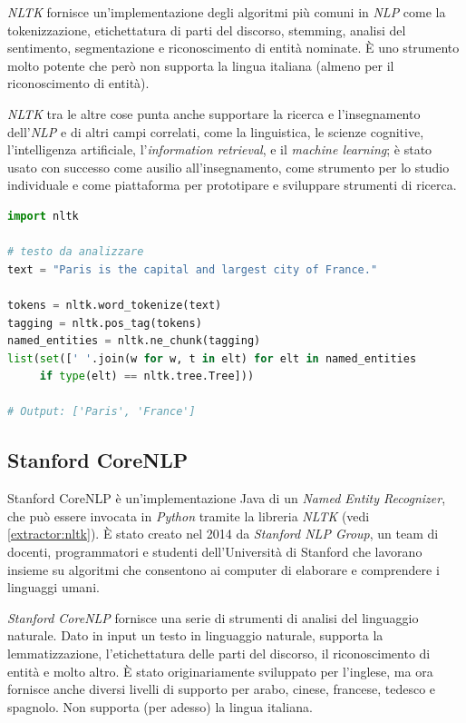 \documentclass[a4paper,11pt]{article}
\begin{document}
\textit{NLTK} fornisce un'implementazione degli algoritmi più comuni in \textit{NLP} come la tokenizzazione, etichettatura di parti del discorso, stemming, analisi del sentimento, segmentazione e riconoscimento di entità nominate. È uno strumento molto potente che però non supporta la lingua italiana (almeno per il riconoscimento di entità).

\textit{NLTK} tra le altre cose punta anche supportare la ricerca e l'insegnamento dell'\textit{NLP} e di altri campi correlati, come la linguistica, le scienze cognitive, l'intelligenza artificiale, l'\textit{information retrieval}, e il \textit{machine learning}; è stato usato con successo come ausilio all'insegnamento, come strumento per lo studio individuale e come piattaforma per prototipare e sviluppare strumenti di ricerca. \cite{wiki:nltk}
\newline

\begin{lstlisting}[basicstyle=\small, language=python, frame=single, caption={Esempio di codice Python per l'estrazione di entità con \textit{NLTK}.},captionpos=b]
import nltk

# testo da analizzare
text = "Paris is the capital and largest city of France."

tokens = nltk.word_tokenize(text)
tagging = nltk.pos_tag(tokens)
named_entities = nltk.ne_chunk(tagging)
list(set([' '.join(w for w, t in elt) for elt in named_entities 
     if type(elt) == nltk.tree.Tree]))

# Output: ['Paris', 'France']
\end{lstlisting}

\subsection{Stanford CoreNLP}
\label{extractor:stanford-corenlp}
Stanford CoreNLP è un'implementazione Java di un \textit{Named Entity Recognizer}, che può essere invocata in \textit{Python} tramite la libreria \textit{NLTK} (vedi \ref{extractor:nltk}). È stato creato nel 2014 da \textit{Stanford NLP Group}, un team di docenti, programmatori e studenti dell'Università di Stanford che lavorano insieme su algoritmi che consentono ai computer di elaborare e comprendere i linguaggi umani.

\textit{Stanford CoreNLP} fornisce una serie di strumenti di analisi del linguaggio naturale. Dato in input un testo in linguaggio naturale, supporta la lemmatizzazione, l'etichettatura delle parti del discorso, il riconoscimento di entità e molto altro. È stato originariamente sviluppato per l'inglese, ma ora fornisce anche diversi livelli di supporto per arabo, cinese, francese, tedesco e spagnolo. Non supporta (per adesso) la lingua italiana.
\end{document}
